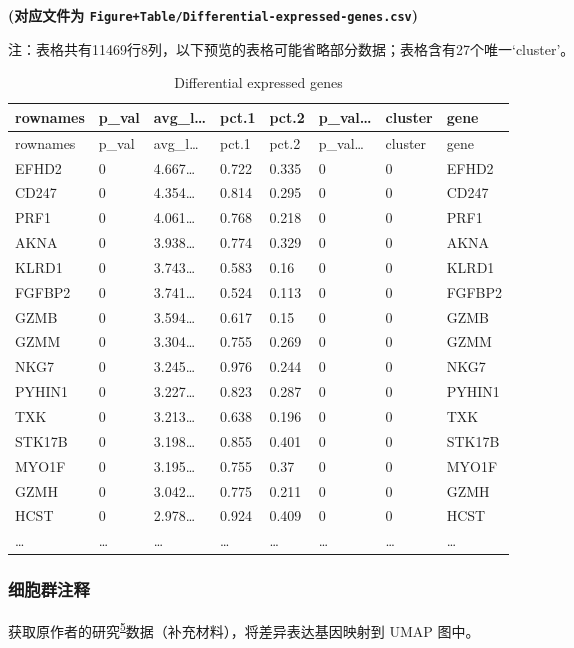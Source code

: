 \documentclass[
]{article}
\begin{document}
\textbf{(对应文件为 \texttt{Figure+Table/Differential-expressed-genes.csv})}

\begin{center}\begin{tcolorbox}[colback=gray!10, colframe=gray!50, width=0.9\linewidth, arc=1mm, boxrule=0.5pt]注：表格共有11469行8列，以下预览的表格可能省略部分数据；表格含有27个唯一`cluster'。
\end{tcolorbox}
\end{center}

\begin{longtable}[]{@{}llllllll@{}}
\caption{\label{tab:Differential-expressed-genes}Differential expressed genes}\tabularnewline
\toprule
rownames & p\_val & avg\_l\ldots{} & pct.1 & pct.2 & p\_val\ldots{} & cluster & gene\tabularnewline
\midrule
\endfirsthead
\toprule
rownames & p\_val & avg\_l\ldots{} & pct.1 & pct.2 & p\_val\ldots{} & cluster & gene\tabularnewline
\midrule
\endhead
EFHD2 & 0 & 4.667\ldots{} & 0.722 & 0.335 & 0 & 0 & EFHD2\tabularnewline
CD247 & 0 & 4.354\ldots{} & 0.814 & 0.295 & 0 & 0 & CD247\tabularnewline
PRF1 & 0 & 4.061\ldots{} & 0.768 & 0.218 & 0 & 0 & PRF1\tabularnewline
AKNA & 0 & 3.938\ldots{} & 0.774 & 0.329 & 0 & 0 & AKNA\tabularnewline
KLRD1 & 0 & 3.743\ldots{} & 0.583 & 0.16 & 0 & 0 & KLRD1\tabularnewline
FGFBP2 & 0 & 3.741\ldots{} & 0.524 & 0.113 & 0 & 0 & FGFBP2\tabularnewline
GZMB & 0 & 3.594\ldots{} & 0.617 & 0.15 & 0 & 0 & GZMB\tabularnewline
GZMM & 0 & 3.304\ldots{} & 0.755 & 0.269 & 0 & 0 & GZMM\tabularnewline
NKG7 & 0 & 3.245\ldots{} & 0.976 & 0.244 & 0 & 0 & NKG7\tabularnewline
PYHIN1 & 0 & 3.227\ldots{} & 0.823 & 0.287 & 0 & 0 & PYHIN1\tabularnewline
TXK & 0 & 3.213\ldots{} & 0.638 & 0.196 & 0 & 0 & TXK\tabularnewline
STK17B & 0 & 3.198\ldots{} & 0.855 & 0.401 & 0 & 0 & STK17B\tabularnewline
MYO1F & 0 & 3.195\ldots{} & 0.755 & 0.37 & 0 & 0 & MYO1F\tabularnewline
GZMH & 0 & 3.042\ldots{} & 0.775 & 0.211 & 0 & 0 & GZMH\tabularnewline
HCST & 0 & 2.978\ldots{} & 0.924 & 0.409 & 0 & 0 & HCST\tabularnewline
\ldots{} & \ldots{} & \ldots{} & \ldots{} & \ldots{} & \ldots{} & \ldots{} & \ldots{}\tabularnewline
\bottomrule
\end{longtable}

\hypertarget{ux7ec6ux80deux7fa4ux6ce8ux91ca}{%
\subsubsection{细胞群注释}\label{ux7ec6ux80deux7fa4ux6ce8ux91ca}}

获取原作者的研究\textsuperscript{\protect\hyperlink{ref-IntegrativeSinYuZh2023}{5}}数据（补充材料），将差异表达基因映射到 UMAP 图中。
\end{document}
